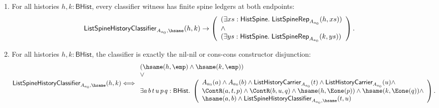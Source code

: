 \begin{theorem}
\begin{enumerate}
$$\begin{array}{l}
  A_{a_0}(a)\land \mathsf{ListHistoryCarrier}_{A_{a_0}}(t)\land
  \mathsf{ListPublicLength}_{A_{a_0}}(t,n)\land\\
  \ContR(a,t,p)\land \hsame(h,\Eone(p))
  \end{array}
  \right).
  $$
  \item
  For all histories $h,k:\mathsf{BHist}$, every classifier witness has finite
  spine ledgers at both endpoints:
  $$
  \mathsf{ListSpineHistoryClassifier}_{A_{a_0},\hsame}(h,k)
  \to
  \left(
  \begin{array}{l}
  (\exists xs:\mathsf{HistSpine}.\;\mathsf{ListSpineRep}_{A_{a_0}}(h,xs))\\
  \land\\
  (\exists ys:\mathsf{HistSpine}.\;\mathsf{ListSpineRep}_{A_{a_0}}(k,ys))
  \end{array}
  \right).
  $$
  \item
  For all histories $h,k:\mathsf{BHist}$, the classifier is exactly the nil-nil
  or cons-cons constructor disjunction:
  $$
  \mathsf{ListSpineHistoryClassifier}_{A_{a_0},\hsame}(h,k)
  \Longleftrightarrow
  \begin{array}{l}
  (\hsame(h,\emp)\land \hsame(k,\emp))\\
  \lor\\
  \exists a\,b\,t\,u\,p\,q:\mathsf{BHist}.\;
  \left(
  \begin{array}{l}
  A_{a_0}(a)\land A_{a_0}(b)\land
  \mathsf{ListHistoryCarrier}_{A_{a_0}}(t)\land
  \mathsf{ListHistoryCarrier}_{A_{a_0}}(u)\land\\
  \ContR(a,t,p)\land \ContR(b,u,q)\land
  \hsame(h,\Eone(p))\land \hsame(k,\Eone(q))\land\\
  \hsame(a,b)\land
  \mathsf{ListSpineHistoryClassifier}_{A_{a_0},\hsame}(t,u)
  \end{array}
  \right).
  \end{array}
  $$
\end{enumerate}
\end{theorem}
